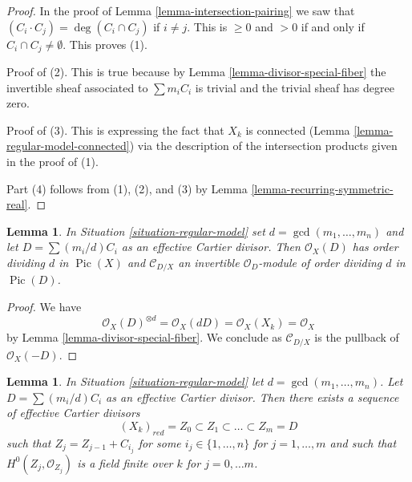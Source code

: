 \documentclass{stacks-project}
\newenvironment{reference}{\comment}{\endcomment}
\theoremstyle{plain}
\newtheorem{lemma}[subsection]{Lemma}
\theoremstyle{definition}
\theoremstyle{remark}
\numberwithin{equation}{subsection}
\def\Pic{\mathop{\mathrm{Pic}}\nolimits}
\begin{document}
\begin{proof}
In the proof of Lemma \ref{lemma-intersection-pairing} we saw that
$(C_i \cdot C_j) = \deg(C_i \cap C_j)$ if $i \not = j$. This is
$\geq 0$ and $> 0 $ if and only if $C_i \cap C_j \not = \emptyset$.
This proves (1).

\medskip\noindent
Proof of (2). This is true because by Lemma \ref{lemma-divisor-special-fiber}
the invertible sheaf associated to $\sum m_i C_i$
is trivial and the trivial sheaf has degree zero.

\medskip\noindent
Proof of (3). This is expressing the fact that $X_k$ is connected
(Lemma \ref{lemma-regular-model-connected})
via the description of the intersection products given in the proof of (1).

\medskip\noindent
Part (4) follows from (1), (2), and (3) by
Lemma \ref{lemma-recurring-symmetric-real}.
\end{proof}

\begin{lemma}
\label{lemma-multiple-fibre-normal-bundle}
In Situation \ref{situation-regular-model} set $d = \gcd(m_1, \ldots, m_n)$
and let $D = \sum (m_i/d)C_i$ as an effective Cartier divisor.
Then $\mathcal{O}_X(D)$ has order dividing $d$ in $\Pic(X)$
and $\mathcal{C}_{D/X}$ an invertible $\mathcal{O}_D$-module
of order dividing $d$ in $\Pic(D)$.
\end{lemma}

\begin{proof}
We have
$$
\mathcal{O}_X(D)^{\otimes d} = \mathcal{O}_X(dD) =
\mathcal{O}_X(X_k) = \mathcal{O}_X
$$
by Lemma \ref{lemma-divisor-special-fiber}.
We conclude as $\mathcal{C}_{D/X}$ is the pullback of
$\mathcal{O}_X(-D)$.
\end{proof}

\begin{lemma}
\label{lemma-regular-model-field}
\begin{reference}
\cite[Lemma 2.6]{Artin-Winters}
\end{reference}
In Situation \ref{situation-regular-model} let $d = \gcd(m_1, \ldots, m_n)$.
Let $D = \sum (m_i/d) C_i$ as an effective Cartier divisor. Then there exists
a sequence of effective Cartier divisors
$$
(X_k)_{red} = Z_0 \subset Z_1 \subset \ldots \subset Z_m = D
$$
such that $Z_j = Z_{j - 1} + C_{i_j}$ for some $i_j \in \{1, \ldots, n\}$
for $j = 1, \ldots, m$ and such that $H^0(Z_j, \mathcal{O}_{Z_j})$
is a field finite over $k$ for $j = 0, \ldots m$.
\end{lemma}
\end{document}
